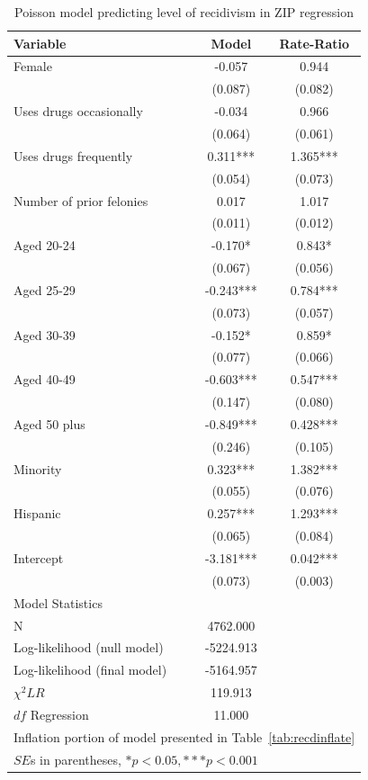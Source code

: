 \begin{table}[htbp]\centering
 \caption{Poisson model predicting level of recidivism in ZIP regression \label{tab:recdzip}}
\begin{tabular}{lcc}
\hline
Variable      &    Model & Rate-Ratio  \\
\hline
Female   &   -0.057  &    0.944  \\
      &   (0.087)  &   (0.082)  \\
Uses drugs occasionally   &   -0.034  &    0.966  \\
      &   (0.064)  &   (0.061)  \\
Uses drugs frequently   &    0.311***&    1.365***\\
      &   (0.054)  &   (0.073)  \\
Number of prior felonies    &    0.017  &    1.017  \\
      &   (0.011)  &   (0.012)  \\
Aged 20-24   &   -0.170* &    0.843* \\
      &   (0.067)  &   (0.056)  \\
Aged 25-29   &   -0.243***&    0.784***\\
      &   (0.073)  &   (0.057)  \\
Aged 30-39   &   -0.152* &    0.859* \\
      &   (0.077)  &   (0.066)  \\
Aged 40-49   &   -0.603***&    0.547***\\
      &   (0.147)  &   (0.080)  \\
Aged 50 plus   &   -0.849***&    0.428***\\
      &   (0.246)  &   (0.105)  \\
Minority    &    0.323***&    1.382***\\
      &   (0.055)  &   (0.076)  \\
Hispanic     &    0.257***&    1.293***\\
      &   (0.065)  &   (0.084)  \\
Intercept    &   -3.181***&    0.042***\\
      &   (0.073)  &   (0.003)  \\
\hline
\multicolumn{1}{l}{Model Statistics} \\
\hline
N      &   4762.000  \\
Log-likelihood (null model)    &  -5224.913  \\
Log-likelihood (final model)     &  -5164.957  \\
$\chi^2 LR$    &   119.913  \\
$df$ Regression    &    11.000  \\
\hline
\multicolumn{3}{l}{Inflation portion of model presented in Table~\ref{tab:recdinflate}} \\
\multicolumn{3}{l}{$SE$s in parentheses, $*p<0.05, ***p<0.001$} \\
\hline
\end{tabular}
\end{table}

